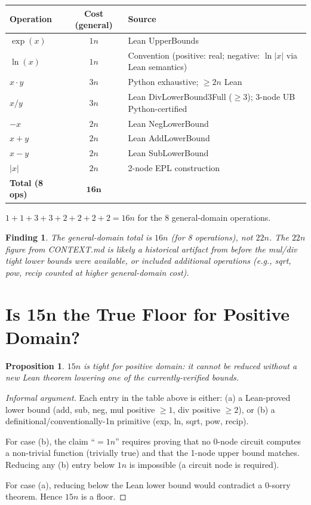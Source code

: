 \documentclass[11pt]{article}
\newtheorem{proposition}[theorem]{Proposition}
\newtheorem{finding}[theorem]{Finding}
\begin{document}
\begin{center}
\begin{tabular}{lcl}
\toprule
Operation & Cost (general) & Source \\
\midrule
$\exp(x)$    & $1n$ & Lean UpperBounds \\
$\ln(x)$     & $1n$ & Convention (positive: real; negative: $\ln|x|$ via Lean semantics) \\
$x \cdot y$  & $3n$ & Python exhaustive; $\geq 2n$ Lean \\
$x / y$      & $3n$ & Lean DivLowerBound3Full ($\geq 3$); 3-node UB Python-certified \\
$-x$         & $2n$ & Lean NegLowerBound \\
$x + y$      & $2n$ & Lean AddLowerBound \\
$x - y$      & $2n$ & Lean SubLowerBound \\
$|x|$        & $2n$ & 2-node EPL construction \\
\midrule
\textbf{Total (8 ops)} & $\mathbf{16n}$ & \\
\bottomrule
\end{tabular}
\end{center}

$1+1+3+3+2+2+2+2 = 16n$ for the 8 general-domain operations.

\begin{finding}
The general-domain total is $16n$ (for 8 operations), not $22n$.
The $22n$ figure from CONTEXT.md is likely a historical artifact from before the
mul/div tight lower bounds were available, or included additional operations
(e.g., sqrt, pow, recip counted at higher general-domain cost).
\end{finding}

\section{Is 15n the True Floor for Positive Domain?}

\begin{proposition}
$15n$ is tight for positive domain: it cannot be reduced without a new Lean theorem
lowering one of the currently-verified bounds.
\end{proposition}

\begin{proof}[Informal argument]
Each entry in the table above is either:
(a) a Lean-proved lower bound (add, sub, neg, mul positive $\geq 1$, div positive $\geq 2$), or
(b) a definitional/conventionally-1n primitive (exp, ln, sqrt, pow, recip).

For case (b), the claim ``$= 1n$'' requires proving that no 0-node circuit computes
a non-trivial function (trivially true) and that the 1-node upper bound matches.
Reducing any (b) entry below $1n$ is impossible (a circuit node is required).

For case (a), reducing below the Lean lower bound would contradict a 0-sorry theorem.
Hence $15n$ is a floor.
\end{proof}
\end{document}
